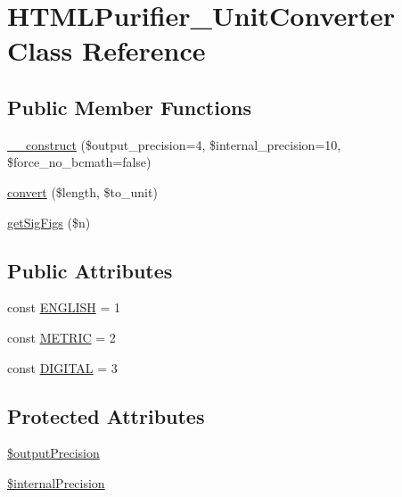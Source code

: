 \hypertarget{classHTMLPurifier__UnitConverter}{\section{H\+T\+M\+L\+Purifier\+\_\+\+Unit\+Converter Class Reference}
\label{classHTMLPurifier__UnitConverter}
}
\subsection*{Public Member Functions}
\begin{DoxyCompactItemize}
\item 
\hyperlink{classHTMLPurifier__UnitConverter_ae64ee84e7be6afca1c84fd4700962e61}{\+\_\+\+\_\+construct} (\$output\+\_\+precision=4, \$internal\+\_\+precision=10, \$force\+\_\+no\+\_\+bcmath=false)
\item 
\hyperlink{classHTMLPurifier__UnitConverter_ab9e2683a00d92f8c75fcfadca7b81727}{convert} (\$length, \$to\+\_\+unit)
\item 
\hyperlink{classHTMLPurifier__UnitConverter_a5b5d3d84d0dda75f4264d1f185793bd0}{get\+Sig\+Figs} (\$n)
\end{DoxyCompactItemize}
\subsection*{Public Attributes}
\begin{DoxyCompactItemize}
\item 
const \hyperlink{classHTMLPurifier__UnitConverter_ab06911eda63b4eb89793cfa661d51b4e}{E\+N\+G\+L\+I\+S\+H} = 1
\item 
const \hyperlink{classHTMLPurifier__UnitConverter_ad7a3bb856734b87a65a7f19316bcb923}{M\+E\+T\+R\+I\+C} = 2
\item 
const \hyperlink{classHTMLPurifier__UnitConverter_af011380387649c67b6da8487cdd161d4}{D\+I\+G\+I\+T\+A\+L} = 3
\end{DoxyCompactItemize}
\subsection*{Protected Attributes}
\begin{DoxyCompactItemize}
\item 
\hyperlink{classHTMLPurifier__UnitConverter_a0f78b7cbeb6d98e1afca5a50e696fa9e}{\$output\+Precision}
\item 
\hyperlink{classHTMLPurifier__UnitConverter_a21579fd5b8beaaf5699c3951737142c3}{\$internal\+Precision}
\end{DoxyCompactItemize}
